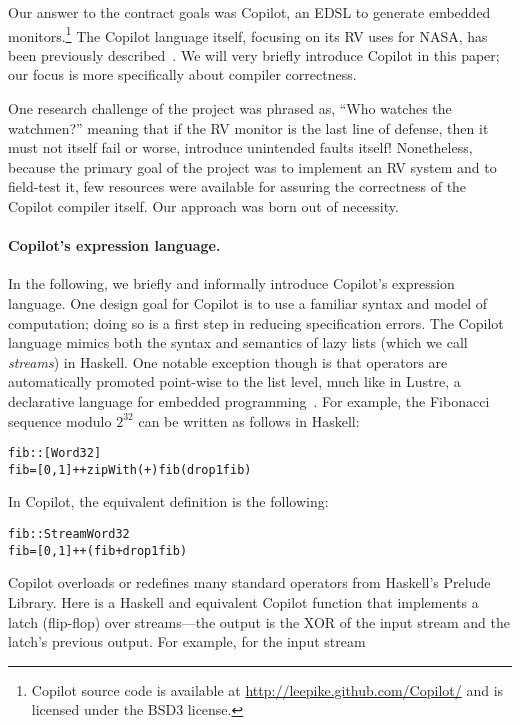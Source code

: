 \documentclass[preprint]{sigplanconf}
\newenvironment{code}{\begin{alltt}\footnotesize}{\end{alltt}}
\begin{document}
Our answer to the contract goals was Copilot, an EDSL to generate embedded
monitors.\footnote{Copilot source code is available at
  \url{http://leepike.github.com/Copilot/} and is licensed under the BSD3
  license.}  The Copilot language itself, focusing on its RV uses for NASA, has
been previously described~\cite{pike-rv-11}.  We will very briefly introduce
Copilot in this paper; our focus is more specifically about compiler
correctness.

One research challenge of the project was phrased as, ``Who watches the
watchmen?'' meaning that if the RV monitor is the last line of defense, then it
must not itself fail or worse, introduce unintended faults itself!  Nonetheless,
because the primary goal of the project was to implement an RV system and to
field-test it, few resources were available for assuring the correctness of the
Copilot compiler itself.  Our approach was born out of necessity.




\paragraph{Copilot's expression language.}
In the following, we briefly and informally introduce Copilot's expression
language.  One design goal for Copilot is to use a familiar syntax and model of
computation; doing so is a first step in reducing specification errors.  The
Copilot language mimics both the syntax and semantics of lazy lists (which we
call \emph{streams}) in Haskell.  One notable exception though is that
operators are automatically promoted point-wise to the list level, much like in
Lustre, a declarative language for embedded programming~\cite{lustre}.  For
example, the Fibonacci sequence modulo $2^{32}$ can be written as follows in Haskell:
%
\begin{code}
fib :: [Word32]
fib = [0,1] ++ zipWith (+) fib (drop 1 fib)
\end{code}
%
In Copilot, the equivalent definition is the following:
\begin{code}
fib :: Stream Word32
fib = [0,1] ++ (fib + drop 1 fib)
\end{code}
%
Copilot overloads or redefines many standard operators from Haskell's Prelude
Library.  Here is a Haskell and equivalent Copilot function that implements a
latch (flip-flop) over streams---the output is the XOR of the input stream and
the latch's previous output.  For example, for the input stream
%
\end{document}
